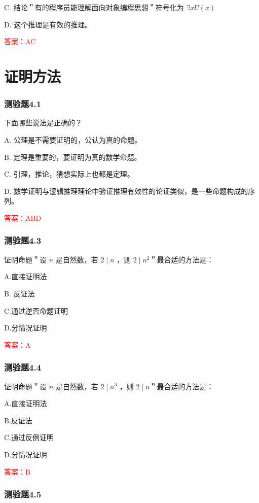 \documentclass[UTF8, heading=true]{ctexart}
\begin{document}
C. 结论＂有的程序员能理解面向对象编程思想＂符号化为 $\exists x U(x)$

D. 这个推理是有效的推理。

\textcolor{red}{答案：AC}


\clearpage

\section{证明方法}

\subsubsection{测验题4.1}

下面哪些说法是正确的？

A. 公理是不需要证明的，公认为真的命题。

B. 定理是重要的，要证明为真的数学命题。

C. 引理，推论，猜想实际上也都是定理。

D. 数学证明与逻辑推理理论中验证推理有效性的论证类似，是一些命题构成的序列。


\textcolor{red}{答案：ABD}


\subsubsection{测验题4.3}

证明命题＂设 $n$ 是自然数，若 $2 \mid n$ ，则 $2 \mid n^2$＂最合适的方法是：

A.直接证明法

B. 反证法

C.通过逆否命题证明

D.分情况证明

\textcolor{red}{答案：A}


\subsubsection{测验题4.4}

证明命题＂设 $n$ 是自然数，若 $2 \mid n^3$ ，则 $2 \mid n$＂最合适的方法是：

A.直接证明法

B.反证法

C.通过反例证明

D.分情况证明

\textcolor{red}{答案：B}

\subsubsection{测验题4.5}
\end{document}
